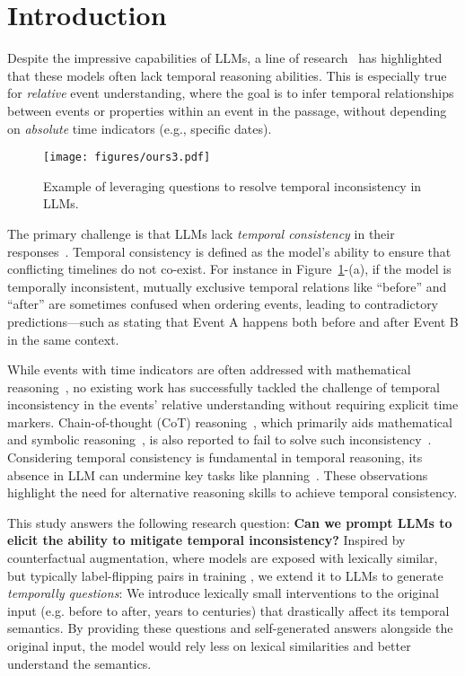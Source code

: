\section{Introduction}


Despite the impressive capabilities of LLMs,
a line of research~\cite{jain-etal-2023-language-models,chu2023timebench} has highlighted that these models often lack temporal reasoning abilities. This is especially true for \textit{relative} event understanding, where the goal is to infer temporal relationships between events or properties within an event in the passage, without depending on \textit{absolute} time indicators (e.g., specific dates).

\begin{figure}[t]
    \centering
    \texttt{[image: figures/ours3.pdf]}
    \caption{Example of leveraging \contrast questions to resolve temporal inconsistency in LLMs.}
    \label{fig:ours}
    \vspace{-7mm}
\end{figure}

The primary challenge is that LLMs lack \textit{temporal consistency} in their responses~\cite{qiu-etal-2024-large, chen2024improving}. Temporal consistency is defined as the model's ability to ensure that conflicting timelines do not co-exist.
For instance in Figure~\ref{fig:ours}-(a), if the model is temporally inconsistent, mutually exclusive temporal relations like ``before'' and ``after'' are sometimes confused when ordering events, leading to contradictory predictions—such as stating that Event A happens both before and after Event B in the same context.

While events with time indicators are often addressed with mathematical reasoning~\cite{zhu2023question,su2024timo}, no existing work has successfully tackled the challenge of temporal inconsistency in the events' relative understanding without requiring explicit time markers. 
Chain-of-thought (CoT) reasoning~\cite{wei2022chain}, which primarily aids mathematical and symbolic reasoning~\cite{sprague2024cotmainlymath}, is also reported 
to fail to solve such inconsistency~\cite{qiu-etal-2024-large}.
Considering temporal consistency is fundamental in temporal reasoning, its absence in LLM can undermine key tasks like planning~\cite{sakaguchi-etal-2021-proscript-partially,zhang-etal-2024-narrative}.
These observations highlight the need for alternative reasoning skills to achieve temporal consistency.


This study answers the following research question: \textbf{Can we prompt LLMs to elicit the ability to mitigate temporal inconsistency?} 
Inspired by counterfactual augmentation,
where models are exposed with lexically similar, but typically label-flipping pairs in training
\cite{kaushik2020learning},
we extend it to LLMs to generate \textit{temporally \contrast questions}: 
We introduce lexically small interventions to the original input (e.g. before to after, years to centuries) that drastically affect its temporal semantics. By providing these questions and self-generated answers alongside the original input, the model would rely less on lexical similarities and better understand the semantics.

